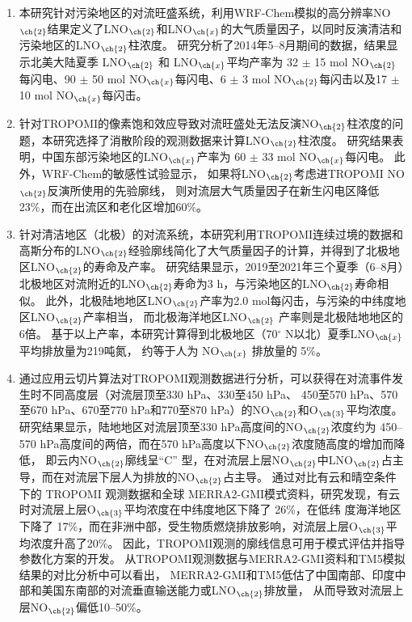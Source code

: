 \begin{enumerate}[label=（\arabic*）, labelindent=\parindent, nosep, leftmargin=0pt, widest=0, itemindent=*, topsep=0pt, partopsep=0pt, parsep=0pt]

\item 本研究针对污染地区的对流旺盛系统，利用WRF-Chem模拟的高分辨率NO$_{\ch{2}}$结果定义了LNO$_{\ch{2}}$和LNO$_{\ch{x}}$的大气质量因子，以同时反演清洁和污染地区的LNO$_{\ch{2}}$柱浓度。
研究分析了2014年5--8月期间的数据，结果显示北美大陆夏季 LNO$_{\ch{2}}$ 和 LNO$_{\ch{x}}$平均产率为
32 $\pm$ 15 mol NO$_{\ch{2}}$每闪电、90 $\pm$ 50 mol NO$_{\ch{x}}$每闪电、6 $\pm$ 3 mol NO$_{\ch{2}}$每闪击以及17 $\pm$ 10 mol NO$_{\ch{x}}$每闪击。

\item 针对TROPOMI的像素饱和效应导致对流旺盛处无法反演NO$_{\ch{2}}$柱浓度的问题，本研究选择了消散阶段的观测数据来计算LNO$_{\ch{2}}$柱浓度。
研究结果表明，中国东部污染地区的LNO$_{\ch{x}}$产率为 60 $\pm$ 33 mol NO$_{\ch{x}}$每闪电。
此外，WRF-Chem的敏感性试验显示，
如果将LNO$_{\ch{2}}$考虑进TROPOMI NO$_{\ch{2}}$反演所使用的先验廓线，
则对流层大气质量因子在新生闪电区降低23\%，而在出流区和老化区增加60\%。

\item 针对清洁地区（北极）的对流系统，本研究利用TROPOMI连续过境的数据和高斯分布的LNO$_{\ch{2}}$经验廓线简化了大气质量因子的计算，并得到了北极地区LNO$_{\ch{2}}$的寿命及产率。
研究结果显示，2019至2021年三个夏季（6--8月）北极地区对流附近的LNO$_{\ch{2}}$寿命为3 h，与污染地区的LNO$_{\ch{2}}$寿命相似。
此外，北极陆地地区LNO$_{\ch{2}}$产率为2.0 mol每闪击，与污染的中纬度地区LNO$_{\ch{2}}$产率相当，
而北极海洋地区LNO$_{\ch{2}}$ 产率则是北极陆地地区的6倍。
基于以上产率，本研究计算得到北极地区（70$^{\circ}$ N以北）夏季LNO$_{\ch{x}}$ 平均排放量为219吨氮，
约等于人为 NO$_{\ch{x}}$ 排放量的 5\%。

\item 通过应用云切片算法对TROPOMI观测数据进行分析，可以获得在对流事件发生时不同高度层（对流层顶至330 hPa、330至450 hPa、
450至570 hPa、570至670 hPa、670至770 hPa和770至870 hPa）的NO$_{\ch{2}}$和O$_{\ch{3}}$平均浓度。
研究结果显示，陆地地区对流层顶至330 hPa高度间的NO$_{\ch{2}}$浓度约为 450--570 hPa高度间的两倍，而在570 hPa高度以下NO$_{\ch{2}}$浓度随高度的增加而降低，
即云内NO$_{\ch{2}}$廓线呈“C” 型，在对流层上层NO$_{\ch{2}}$中LNO$_{\ch{2}}$占主导，而在对流层下层人为排放的NO$_{\ch{2}}$占主导。
通过对比有云和晴空条件下的 TROPOMI 观测数据和全球
MERRA2-GMI模式资料，研究发现，有云时对流层上层O$_{\ch{3}}$平均浓度在中纬度地区下降了 26\%，在低纬
度海洋地区下降了 17\%，而在非洲中部，受生物质燃烧排放影响，对流层上层O$_{\ch{3}}$平均浓度升高了20\%。
因此，TROPOMI观测的廓线信息可用于模式评估并指导参数化方案的开发。
从TROPOMI观测数据与MERRA2-GMI资料和TM5模拟结果的对比分析中可以看出，
MERRA2-GMI和TM5低估了中国南部、印度中部和美国东南部的对流垂直输送能力或LNO$_{\ch{2}}$排放量，
从而导致对流层上层NO$_{\ch{2}}$偏低10--50\%。


\end{enumerate}
